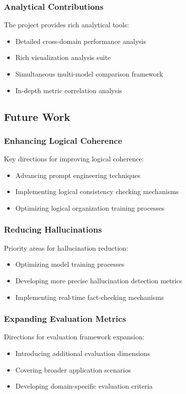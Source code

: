 \subsubsection{Analytical Contributions}
The project provides rich analytical tools:
\begin{itemize}
    \item Detailed cross-domain performance analysis
    \item Rich visualization analysis suite
    \item Simultaneous multi-model comparison framework
    \item In-depth metric correlation analysis
\end{itemize}

\subsection{Future Work}

\subsubsection{Enhancing Logical Coherence}
Key directions for improving logical coherence:
\begin{itemize}
    \item Advancing prompt engineering techniques
    \item Implementing logical consistency checking mechanisms
    \item Optimizing logical organization training processes
\end{itemize}

\subsubsection{Reducing Hallucinations}
Priority areas for hallucination reduction:
\begin{itemize}
    \item Optimizing model training processes
    \item Developing more precise hallucination detection metrics
    \item Implementing real-time fact-checking mechanisms
\end{itemize}

\subsubsection{Expanding Evaluation Metrics}
Directions for evaluation framework expansion:
\begin{itemize}
    \item Introducing additional evaluation dimensions
    \item Covering broader application scenarios
    \item Developing domain-specific evaluation criteria
\end{itemize}

